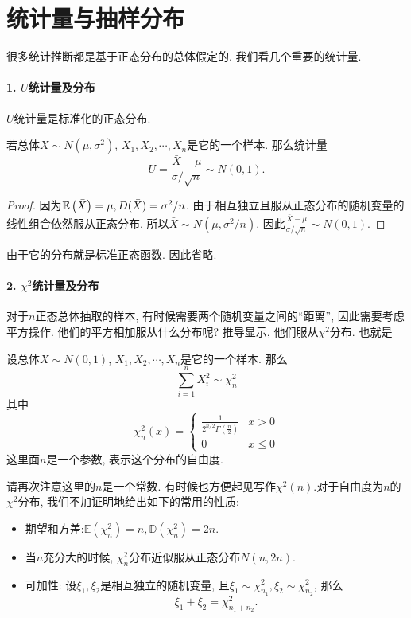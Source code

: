 \section{统计量与抽样分布}

很多统计推断都是基于正态分布的总体假定的. 我们看几个重要的统计量. 

\paragraph{1. $U$统计量及分布} 

$U$统计量是标准化的正态分布. 

\begin{theorem}
    若总体$X\sim N(\mu, \sigma^2)$, $X_1, X_2, \cdots, X_n$是它的一个样本. 那么统计量
    $$
    U=\frac{\bar X-\mu}{\sigma/\sqrt n} \sim N(0, 1).
    $$
\end{theorem}

\begin{proof}
    因为$\mathbb E\left(\bar X\right)=\mu, D(\bar X)=\sigma^2 /n$. 由于相互独立且服从正态分布的随机变量的线性组合依然服从正态分布. 所以$\bar X\sim N(\mu, \sigma^2 / n)$. 因此$\frac{\bar X -\mu}{\sigma / \sqrt n}\sim N(0, 1)$.
\end{proof}

由于它的分布就是标准正态函数. 因此省略. 

\paragraph{2. $\chi^2$统计量及分布}

对于$n$正态总体抽取的样本, 有时候需要两个随机变量之间的``距离'', 因此需要考虑平方操作. 他们的平方相加服从什么分布呢? 推导显示, 他们服从$\chi^2$分布. 也就是

\begin{definition}
    设总体$X\sim N(0, 1)$, $X_1, X_2, \cdots, X_n$是它的一个样本. 那么
    $$
    \sum_{i=1}^n X_i ^2 \sim \chi^2_n
    $$
    其中
    $$
    \chi^2_n(x)=\begin{cases}
        \frac{1}{2^{n/2}\Gamma\left(\frac n2\right)} & x>0\\
        0 & x\leq 0
    \end{cases}
    $$
    这里面$n$是一个参数, 表示这个分布的自由度. 
\end{definition}

请再次注意这里的$n$是一个常数. 有时候也方便起见写作$\chi^2(n)$.对于自由度为$n$的$\chi^2$分布, 我们不加证明地给出如下的常用的性质:
\begin{theorem}
    \begin{itemize}
        \item 期望和方差:$\mathbb E (\chi^2_n)=n, \mathbb D(\chi^2_n)=2n$.
        \item 当$n$充分大的时候, $\chi^2_n$分布近似服从正态分布$N(n, 2n)$.
        \item 可加性: 设$\xi_1, \xi_2$是相互独立的随机变量, 且$\xi_1 \sim \chi^2_{n_1}, \xi_2 \sim \chi^2_{n_2}$, 那么$$\xi_1+\xi_2=\chi_{n_1+n_2}^2.$$
    \end{itemize}
\end{theorem}

